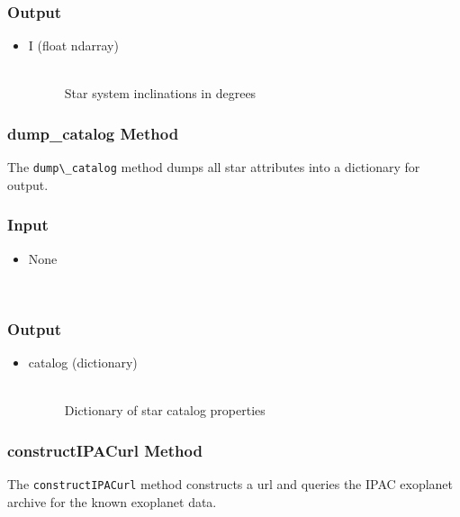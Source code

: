 \documentclass[cleanfoot]{asme2ej}
\begin{document}
\subsubsection*{Output}
\begin{itemize}
\item
\begin{description}
    \item[I (float ndarray)] \hfill \\ Star system inclinations in degrees
\end{description}
\end{itemize}

\subsubsection{dump\_catalog Method} \label{sec:dump_catalogtask}
The \verb+dump\_catalog+ method dumps all star attributes into a dictionary for output.
\subsubsection*{Input}
\begin{itemize}
\item 
\begin{description}
    \item[None] \hfill \\
\end{description}
\end{itemize}
\subsubsection*{Output}
\begin{itemize}
\item
\begin{description}
    \item[catalog (dictionary)] \hfill \\ Dictionary of star catalog properties
\end{description}
\end{itemize}

\subsubsection{constructIPACurl Method} \label{sec:constructIPACurltask}
The \verb+constructIPACurl+ method constructs a url and queries the IPAC exoplanet archive for the known exoplanet data.
\end{document}
